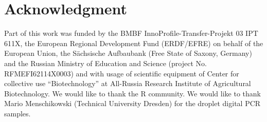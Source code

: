 \section{Acknowledgment}

Part of this work was funded by the BMBF InnoProfile-Transfer-Projekt 03 IPT 
611X, the European Regional Development Fund (ERDF/EFRE) on behalf of the 
European Union, the S\"{a}chsische Aufbaubank (Free State of Saxony, 
Germany) and the Russian Ministry of Education and Science (project No. 
RFMEFI62114X0003) and with usage of scientific equipment of Center for 
collective use ``Biotechnology'' at All-Russia Research Institute of 
Agricultural Biotechnology. We would like to thank the R community. We would 
like to thank Mario Menschikowski (Technical University Dresden) for the droplet 
digital PCR samples. 



\address{Stefan R\"odiger (corresponding author)\\
  Faculty of Natural Sciences\\
  Brandenburg University of Technology Cottbus--Senftenberg\\
  Senftenberg\\
  Germany}

\address{Micha\l{} Burdukiewicz\\
  University of Wroclaw\\
  Faculty of Biotechnoloy\\
  Department of Genomics\\
  Wroclaw\\
  Poland}

\address{Konstantin Blagodatskikh\\
  All-Russia Research Institute of Agricultural Biotechnology\\
  Center for collective use ``Biotechnology''\\
  Moscow\\
  Russia}

\address{Michael Jahn\\
  Helmholtz Centre for Environmental Research - UFZ\\
  Flow cytometry group / Environmental microbiology\\
  Leipzig\\
  Germany}

\address{Peter Schierack\\
  Faculty of Natural Sciences\\
  Brandenburg University of Technology Cottbus--Senftenberg\\
  Senftenberg\\
  Germany}
